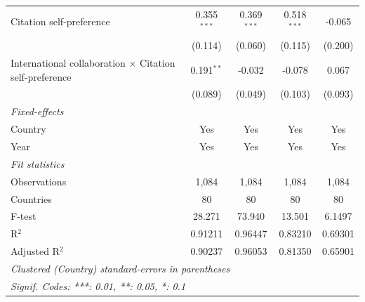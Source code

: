 \begin{table}[H]
\begin{tabular}{lcccc}
      Citation self-preference                                       & 0.355$^{***}$     & 0.369$^{***}$ & 0.518$^{***}$ & -0.065\\   
                                                                     & (0.114)           & (0.060)       & (0.115)       & (0.200)\\   
      International collaboration $\times$ Citation self-preference  & 0.191$^{**}$      & -0.032        & -0.078        & 0.067\\   
                                                                     & (0.089)           & (0.049)       & (0.103)       & (0.093)\\   
      \midrule
      \emph{Fixed-effects}\\
      Country                                                        & Yes               & Yes           & Yes           & Yes\\  
      Year                                                           & Yes               & Yes           & Yes           & Yes\\  
      \midrule
      \emph{Fit statistics}\\
      Observations                                                   & 1,084             & 1,084         & 1,084         & 1,084\\  
      Countries                                                      & 80                & 80            & 80            & 80\\  
      F-test                                                         & 28.271            & 73.940        & 13.501        & 6.1497\\  
      R$^2$                                                          & 0.91211           & 0.96447       & 0.83210       & 0.69301\\  
      Adjusted R$^2$                                                 & 0.90237           & 0.96053       & 0.81350       & 0.65901\\  
      \midrule \midrule
      \multicolumn{5}{l}{\emph{Clustered (Country) standard-errors in parentheses}}\\
      \multicolumn{5}{l}{\emph{Signif. Codes: ***: 0.01, **: 0.05, *: 0.1}}\\
   \end{tabular}
\end{table}


